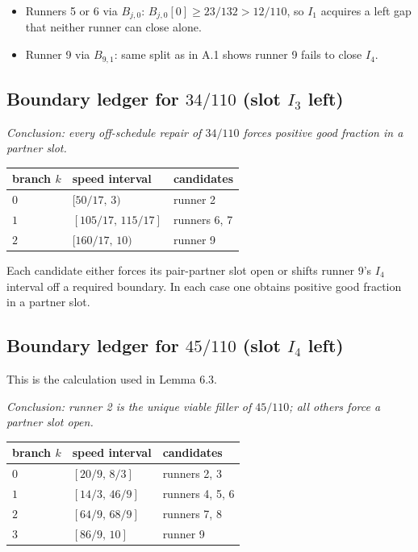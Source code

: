 \documentclass[12pt]{article}
\begin{document}
\begin{itemize}
\item Runners 5 or 6 via $B_{j,0}$: $B_{j,0}[0]\ge 23/132>12/110$, so $I_1$ acquires a
  left gap that neither runner can close alone.
\item Runner 9 via $B_{9,1}$: same split as in A.1 shows runner 9 fails to close $I_4$.
\end{itemize}

\subsection{Boundary ledger for $34/110$ (slot $I_3$ left)}

\emph{Conclusion: every off-schedule repair of $34/110$ forces positive good fraction in a
partner slot.}

\begin{center}
\begin{tabular}{@{}lll@{}}
\toprule
branch $k$ & speed interval & candidates \\
\midrule
$0$ & $[50/17,\,3)$ & runner 2 \\
$1$ & $[105/17,\,115/17]$ & runners 6, 7 \\
$2$ & $[160/17,\,10)$ & runner 9 \\
\bottomrule
\end{tabular}
\end{center}

Each candidate either forces its pair-partner slot open or shifts runner 9's $I_4$ interval
off a required boundary. In each case one obtains positive good fraction in a partner slot.

\subsection{Boundary ledger for $45/110$ (slot $I_4$ left)}

This is the calculation used in Lemma 6.3.

\emph{Conclusion: runner 2 is the unique viable filler of $45/110$; all others force a partner
slot open.}

\begin{center}
\begin{tabular}{@{}lll@{}}
\toprule
branch $k$ & speed interval & candidates \\
\midrule
$0$ & $[20/9,\,8/3]$ & runners 2, 3 \\
$1$ & $[14/3,\,46/9]$ & runners 4, 5, 6 \\
$2$ & $[64/9,\,68/9]$ & runners 7, 8 \\
$3$ & $[86/9,\,10]$ & runner 9 \\
\bottomrule
\end{tabular}
\end{center}
\end{document}
